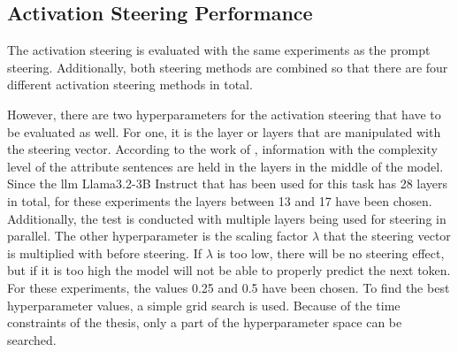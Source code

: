 \subsection{Activation Steering Performance}
The activation steering is evaluated with the same experiments as the prompt steering. Additionally, both steering methods are combined so that there are four different activation steering methods in total. %

However, there are two hyperparameters for the activation steering that have to be evaluated as well. For one, it is the layer or layers that are manipulated with the steering vector. According to the work of \citet{konenStyleVectorsSteering2024,bogdanEmergentEffectsScaling2025}, information with the complexity level of the attribute sentences are held in the layers in the middle of the model. Since the \ac{llm} Llama3.2-3B Instruct that has been used for this task has \num{28} layers in total, for these experiments the layers between \num{13} and \num{17} have been chosen. Additionally, the test is conducted with multiple layers being used for steering in parallel.
The other hyperparameter is the scaling factor \(\lambda\) that the steering vector is multiplied with before steering. If \(\lambda\) is too low, there will be no steering effect, but if it is too high the model will not be able to properly predict the next token. For these experiments, the values \num{0.25} and \num{0.5} have been chosen.
To find the best hyperparameter values, a simple grid search is used. Because of the time constraints of the thesis, only a part of the hyperparameter space can be searched.
